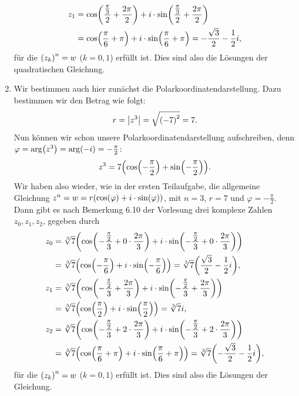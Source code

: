 \documentclass[german,12pt]{homework}
\DeclarePairedDelimiter{\absolute}{\lvert}{\rvert}
\DeclarePairedDelimiter{\enbrace}{(}{)}
\begin{document}
\begin{enumerate}
\begin{align*}
            z_1 &= \cos\enbrace*{\frac{\frac{\pi}{3}}{2} + \frac{2\pi}{2}} + i
            \cdot \sin\enbrace*{\frac{\frac{\pi}{3}}{2} + \frac{2\pi}{2}}\\
            &= \cos\enbrace*{\frac{\pi}{6} + \pi} + i \cdot
            \sin\enbrace*{\frac{\pi}{6} + \pi} = -\frac{\sqrt{3}}{2} -
            \frac{1}{2}i,
        \end{align*}
        für die \(\enbrace*{z_k}^n = w\) (\(k = 0, 1\)) erfüllt ist. Dies sind
        also die Lösungen der quadratischen Gleichung.
        \item Wir bestimmen auch hier zunächst die Polarkoordinatendarstellung.
        Dazu bestimmen wir den Betrag wie folgt:
        \[r = \absolute*{z^3} = \sqrt{\enbrace*{-7}^2} = 7.\]
        Nun können wir schon unsere Polarkoordinatendarstellung aufschreiben,
        denn \(\varphi = \arg\enbrace*{z^3} = \arg\enbrace*{-i} = -
        \frac{\pi}{2}\):
        \[z^3 = 7\enbrace*{\cos\enbrace*{-\frac{\pi}{2}} + \sin\enbrace*{-
        \frac{\pi}{2}}}.\]
        Wir haben also wieder, wie in der ersten Teilaufgabe, die allgemeine
        Gleichung \(z^n = w = r\enbrace*{\cos\enbrace*{\varphi} + i \cdot
        \sin\enbrace*{\varphi}}\), mit \(n = 3\), \(r = 7\) und \(\varphi = -
        \frac{\pi}{2}\). Dann gibt es nach Bemerkung 6.10 der Vorlesung drei
        komplexe Zahlen \(z_0, z_1, z_2\), gegeben durch
        \begin{align*}
            z_0 &= \sqrt[3]{7}\enbrace*{\cos\enbrace*{-\frac{\frac{\pi}{2}}{3}
            + 0 \cdot \frac{2\pi}{3}} + i \cdot \sin\enbrace*{-
            \frac{\frac{\pi}{2}}{3} + 0 \cdot \frac{2\pi}{3}}}\\
            &= \sqrt[3]{7}\enbrace*{\cos\enbrace*{-\frac{\pi}{6}} + i \cdot
            \sin\enbrace*{-\frac{\pi}{6}}} =
            \sqrt[3]{7}\enbrace*{\frac{\sqrt{3}}{2} - \frac{1}{2}i},\\
            z_1 &= \sqrt[3]{7}\enbrace*{\cos\enbrace*{-\frac{\frac{\pi}{2}}{3}
            + \frac{2\pi}{3}} + i \cdot \sin\enbrace*{-\frac{\frac{\pi}{2}}{3}
            + \frac{2\pi}{3}}}\\
            &= \sqrt[3]{7}\enbrace*{\cos\enbrace*{\frac{\pi}{2}} + i \cdot
            \sin\enbrace*{\frac{\pi}{2}}} = \sqrt[3]{7}i,\\
            z_2 &= \sqrt[3]{7}\enbrace*{\cos\enbrace*{-\frac{\frac{\pi}{2}}{3}
            + 2 \cdot \frac{2\pi}{3}} + i \cdot \sin\enbrace*{-
            \frac{\frac{\pi}{2}}{3} + 2 \cdot \frac{2\pi}{3}}}\\
            &= \sqrt[3]{7}\enbrace*{\cos\enbrace*{\frac{\pi}{6} + \pi} + i
            \cdot \sin\enbrace*{\frac{\pi}{6} + \pi}} = \sqrt[3]{7}\enbrace*{-
            \frac{\sqrt{3}}{2} - \frac{1}{2}i},
        \end{align*}
        für die \(\enbrace*{z_k}^n = w\) (\(k = 0, 1\)) erfüllt ist. Dies sind
        also die Lösungen der Gleichung.
    \end{enumerate}
\end{document}
